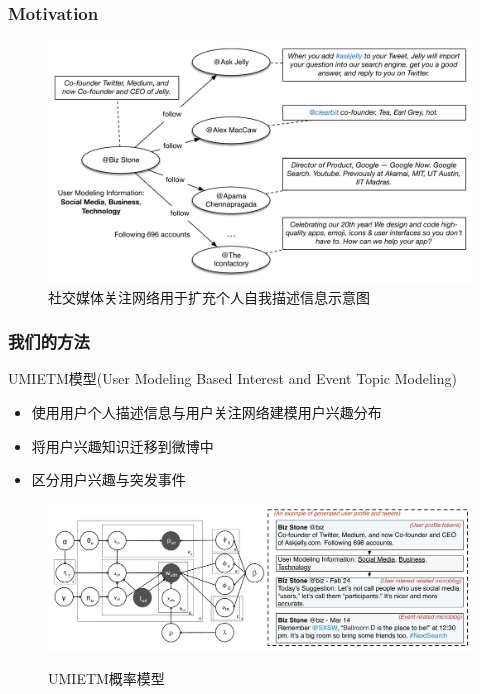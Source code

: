 \begin{frame}
\frametitle{Motivation}
\begin{figure}[h]
		\setlength{\abovecaptionskip}{0.cm}
        \setlength{\belowcaptionskip}{0.cm}
        \centering
		\caption{社交媒体关注网络用于扩充个人自我描述信息示意图}
        \includegraphics[width=0.9\columnwidth]{img/UMIETM/UMIETM_profile.pdf}
\end{figure}
\end{frame}

\begin{frame}
\frametitle{我们的方法}
UMIETM模型(User Modeling Based Interest and Event Topic Modeling)
\begin{itemize}
\item 使用用户个人描述信息与用户关注网络建模用户兴趣分布
\item 将用户兴趣知识迁移到微博中
\item 区分用户兴趣与突发事件
\end{itemize}

\vspace{-3mm}
\begin{figure}
	\setlength{\abovecaptionskip}{0.cm}
	\setlength{\belowcaptionskip}{0.cm}
	\caption{UMIETM概率模型}
	\includegraphics[width=1.0\textwidth]{img/UMIETM/model.pdf}
	\label{fig:modelUMIETM}
\end{figure}
\end{frame}

